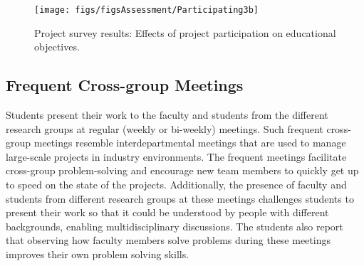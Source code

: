 \documentclass[journal,twopages]{IEEEtran}
\newcommand{\makered}[1]{\color{black}#1\color{black}}
\begin{document}
\begin{figure*}[t]
\centering
\texttt{[image: figs/figsAssessment/Participating3b]}\caption{ \label{fig:SurveyHighlights} Project survey results: Effects of project participation on educational objectives.}
\end{figure*}

\subsection{Frequent Cross-group Meetings}

Students present their work to the faculty and students from the different research groups at regular (weekly or bi-weekly) meetings. Such frequent cross-group meetings resemble interdepartmental meetings that are used to manage large-scale projects in industry environments. The frequent meetings facilitate cross-group problem-solving and encourage new team members to quickly get up to speed on the state of the projects. Additionally, the presence of faculty and students from different research groups at these meetings challenges students to present their work so that it could be understood by people with different backgrounds, enabling multidisciplinary discussions. The students also report that observing how faculty members solve problems during these meetings improves their own problem solving skills.


\iffalse
\makered{The frequent cross-group meetings and collaboration closely resemble \emph{industry or graduate school working environments}. The frequent meetings encourage students (who typically join the project at the beginning of the semester) to get up to speed in relatively short time frames, similar to industry positions.}
\fi
\end{document}
